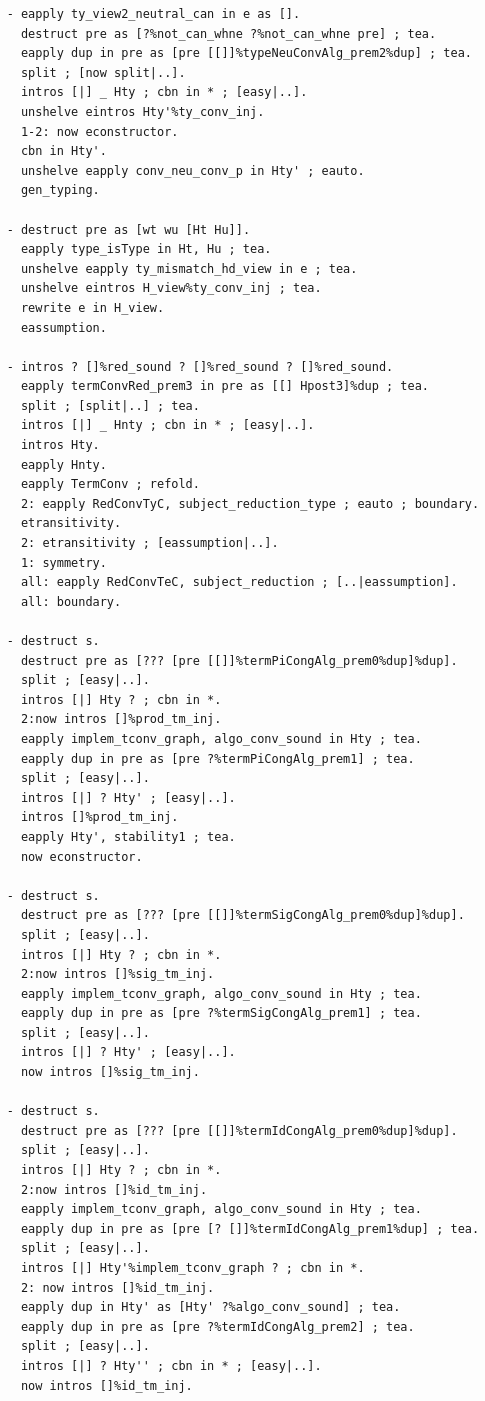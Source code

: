 \begin{lstlisting}
    - eapply ty_view2_neutral_can in e as [].
      destruct pre as [?%not_can_whne ?%not_can_whne pre] ; tea.
      eapply dup in pre as [pre [[]]%typeNeuConvAlg_prem2%dup] ; tea.
      split ; [now split|..].
      intros [|] _ Hty ; cbn in * ; [easy|..].
      unshelve eintros Hty'%ty_conv_inj.
      1-2: now econstructor.
      cbn in Hty'.
      unshelve eapply conv_neu_conv_p in Hty' ; eauto.
      gen_typing.

    - destruct pre as [wt wu [Ht Hu]].
      eapply type_isType in Ht, Hu ; tea.
      unshelve eapply ty_mismatch_hd_view in e ; tea.
      unshelve eintros H_view%ty_conv_inj ; tea.
      rewrite e in H_view.
      eassumption.

    - intros ? []%red_sound ? []%red_sound ? []%red_sound.
      eapply termConvRed_prem3 in pre as [[] Hpost3]%dup ; tea.
      split ; [split|..] ; tea.
      intros [|] _ Hnty ; cbn in * ; [easy|..].
      intros Hty.
      eapply Hnty.
      eapply TermConv ; refold.
      2: eapply RedConvTyC, subject_reduction_type ; eauto ; boundary.
      etransitivity.
      2: etransitivity ; [eassumption|..].
      1: symmetry.
      all: eapply RedConvTeC, subject_reduction ; [..|eassumption].
      all: boundary.

    - destruct s.
      destruct pre as [??? [pre [[]]%termPiCongAlg_prem0%dup]%dup].
      split ; [easy|..].
      intros [|] Hty ? ; cbn in *.
      2:now intros []%prod_tm_inj.
      eapply implem_tconv_graph, algo_conv_sound in Hty ; tea.
      eapply dup in pre as [pre ?%termPiCongAlg_prem1] ; tea.
      split ; [easy|..].
      intros [|] ? Hty' ; [easy|..].
      intros []%prod_tm_inj.
      eapply Hty', stability1 ; tea.
      now econstructor.
      
    - destruct s.
      destruct pre as [??? [pre [[]]%termSigCongAlg_prem0%dup]%dup].
      split ; [easy|..].
      intros [|] Hty ? ; cbn in *.
      2:now intros []%sig_tm_inj.
      eapply implem_tconv_graph, algo_conv_sound in Hty ; tea.
      eapply dup in pre as [pre ?%termSigCongAlg_prem1] ; tea.
      split ; [easy|..].
      intros [|] ? Hty' ; [easy|..].
      now intros []%sig_tm_inj.

    - destruct s.
      destruct pre as [??? [pre [[]]%termIdCongAlg_prem0%dup]%dup].
      split ; [easy|..].
      intros [|] Hty ? ; cbn in *.
      2:now intros []%id_tm_inj.
      eapply implem_tconv_graph, algo_conv_sound in Hty ; tea.
      eapply dup in pre as [pre [? []]%termIdCongAlg_prem1%dup] ; tea.
      split ; [easy|..].
      intros [|] Hty'%implem_tconv_graph ? ; cbn in *.
      2: now intros []%id_tm_inj.
      eapply dup in Hty' as [Hty' ?%algo_conv_sound] ; tea.
      eapply dup in pre as [pre ?%termIdCongAlg_prem2] ; tea.
      split ; [easy|..].
      intros [|] ? Hty'' ; cbn in * ; [easy|..].
      now intros []%id_tm_inj.


\end{lstlisting}
